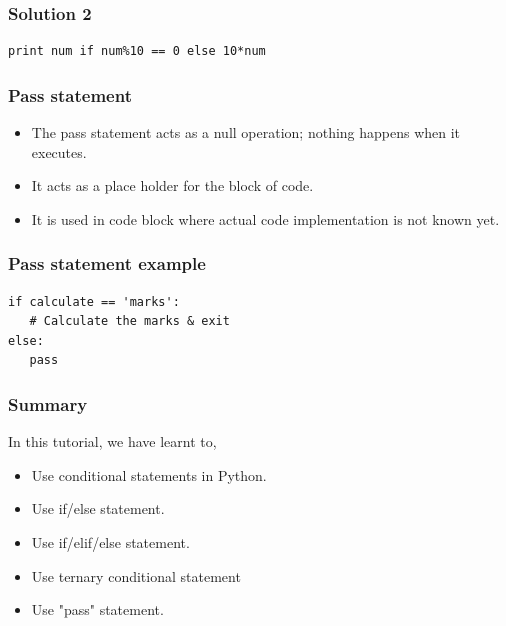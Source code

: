 \documentclass[17pt]{beamer}
\begin{document}
\begin{frame}[fragile]
\frametitle{Solution 2}
\label{sec-8}

\lstset{language=Python}
\begin{small}
\begin{lstlisting}
print num if num%10 == 0 else 10*num
\end{lstlisting}
\end{small}
\end{frame}
\begin{frame}[fragile]
\frametitle{Pass statement}
\begin{itemize}
\item The pass statement acts as a null operation;
nothing happens when it executes.\pause
\item It acts as a place holder for the block of code.\pause
\item It is used in code block where actual code implementation is not known yet.

\end{itemize}
\end{frame}
\begin{frame}[fragile]
\frametitle{Pass statement example}
\label{sec-9}

\lstset{language=Python}
\begin{lstlisting}
if calculate == 'marks':
   # Calculate the marks & exit
else:
   pass\end{lstlisting}
\end{frame}
\begin{frame}
\frametitle{Summary}
\label{sec-10}

 In this tutorial, we have learnt to,


\begin{itemize}
\item Use conditional statements in Python.\pause
\item Use if/else statement.\pause
\item Use if/elif/else statement.\pause
\item Use ternary conditional statement\pause
\item Use "pass" statement.
\end{itemize}
\end{frame}
\end{document}
